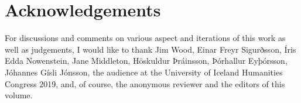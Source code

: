 \documentclass[output=paper]{langscibook}
\begin{document}
\section*{Acknowledgements}
For discussions and comments on various aspect and iterations of this work as well as judgements, I would like to thank Jim Wood, Einar Freyr Sigurðsson, Íris Edda Nowenstein, Jane Middleton, Höskuldur Þráinsson, Þórhallur Eyþórsson, Jóhannes Gísli Jónsson, the audience at the University of Iceland Humanities Congress 2019, and, of course, the anonymous reviewer and the editors of this volume.

\printbibliography[heading=subbibliography,notkeyword=this]
\end{document}
